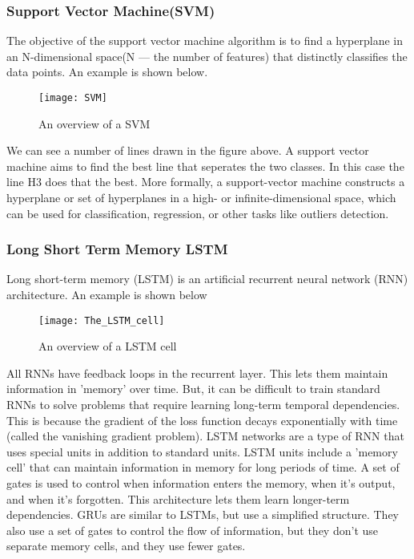 \subsubsection{Support Vector Machine(SVM)}
The objective of the support vector machine algorithm is to find a hyperplane in an N-dimensional space(N — the number of features) that distinctly classifies the data points. An example is shown below.

\begin{figure}[h!]
	\caption{An overview of a SVM}
	\texttt{[image: SVM]}
\end{figure}

We can see a number of lines drawn in the figure above. A support vector machine aims to find the best line that seperates the two classes. In this case the line H3 does that the best. More formally, a support-vector machine constructs a hyperplane or set of hyperplanes in a high- or infinite-dimensional space, which can be used for classification, regression, or other tasks like outliers detection.

\subsubsection{Long Short Term Memory LSTM}
Long short-term memory (LSTM) is an artificial recurrent neural network (RNN) architecture. An example is shown below

\begin{figure}[h!]
	\caption{An overview of a LSTM cell}
	\texttt{[image: The\_LSTM\_cell]}
\end{figure}


All RNNs have feedback loops in the recurrent layer. This lets them maintain information in 'memory' over time. But, it can be difficult to train standard RNNs to solve problems that require learning long-term temporal dependencies. This is because the gradient of the loss function decays exponentially with time (called the vanishing gradient problem). LSTM networks are a type of RNN that uses special units in addition to standard units. LSTM units include a 'memory cell' that can maintain information in memory for long periods of time. A set of gates is used to control when information enters the memory, when it's output, and when it's forgotten. This architecture lets them learn longer-term dependencies. GRUs are similar to LSTMs, but use a simplified structure. They also use a set of gates to control the flow of information, but they don't use separate memory cells, and they use fewer gates.



